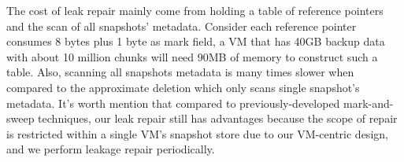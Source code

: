 \begin{itemize}
The cost of leak repair mainly come from holding a table of reference pointers and the scan of all snapshots' metadata.
Consider each reference pointer consumes 8 bytes plus 1 byte as mark field, a VM that has 40GB backup data with about
10 million chunks will need 90MB of memory to construct such a table. 
Also, scanning all snapshots metadata is many times slower when compared
to the approximate deletion which only scans single snapshot's metadata.
It's worth mention that compared to previously-developed mark-and-sweep techniques, 
our leak repair still has advantages because the scope of repair is restricted within a single VM's snapshot 
store due to our VM-centric design, and we perform leakage repair periodically.
\end{itemize}





%



